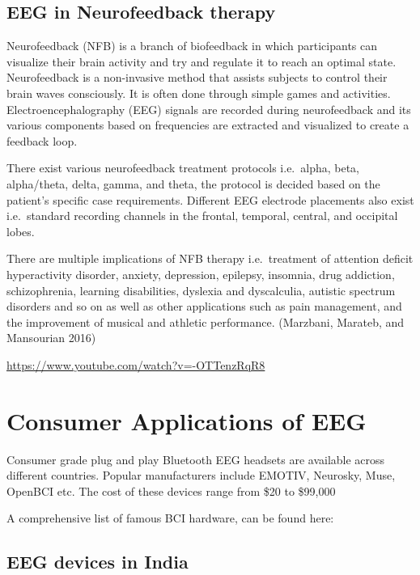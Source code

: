 \documentclass[
  letterpaper,
  DIV=11,
  numbers=noendperiod]{scrreprt}
\begin{document}
\section{EEG in Neurofeedback
therapy}\label{eeg-in-neurofeedback-therapy}

Neurofeedback (NFB) is a branch of biofeedback in which participants can
visualize their brain activity and try and regulate it to reach an
optimal state. Neurofeedback is a non-invasive method that assists
subjects to control their brain waves consciously. It is often done
through simple games and activities. Electroencephalography (EEG)
signals are recorded during neurofeedback and its various components
based on frequencies are extracted and visualized to create a feedback
loop.

There exist various neurofeedback treatment protocols i.e.~alpha, beta,
alpha/theta, delta, gamma, and theta, the protocol is decided based on
the patient's specific case requirements. Different EEG electrode
placements also exist i.e.~standard recording channels in the frontal,
temporal, central, and occipital lobes.

There are multiple implications of NFB therapy i.e.~treatment of
attention deficit hyperactivity disorder, anxiety, depression, epilepsy,
insomnia, drug addiction, schizophrenia, learning disabilities, dyslexia
and dyscalculia, autistic spectrum disorders and so on as well as other
applications such as pain management, and the improvement of musical and
athletic performance. (Marzbani, Marateb, and Mansourian 2016)

\url{https://www.youtube.com/watch?v=-OTTenzRqR8}

\chapter{Consumer Applications of
EEG}\label{consumer-applications-of-eeg}

Consumer grade plug and play Bluetooth EEG headsets are available across
different countries. Popular manufacturers include EMOTIV, Neurosky,
Muse, OpenBCI etc. The cost of these devices range from \$20 to \$99,000

A comprehensive list of famous BCI hardware, can be found here:

\section{EEG devices in India}\label{eeg-devices-in-india}
\end{document}
